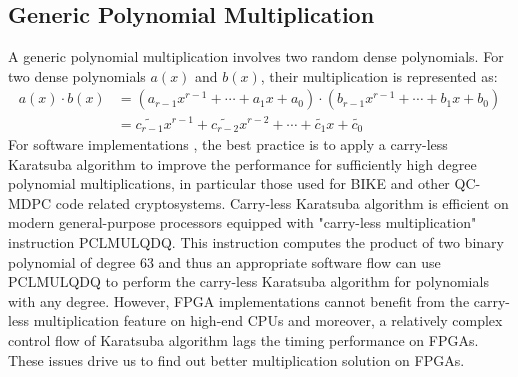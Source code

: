 \documentclass[runningheads]{llncs}
\begin{document}
\subsection{Generic Polynomial Multiplication}
\label{sub::dense}
A generic polynomial multiplication involves two random dense polynomials.
For two dense polynomials $a(x)$ and $b(x)$, their multiplication is represented as:
\begin{align}
    a(x)\cdot b(x) &= (a_{r-1}x^{r-1}+\cdots + a_{1}x + a_0)\cdot(b_{r-1}x^{r-1}+\cdots + b_{1}x + b_0)\\
    &= \widetilde{c_{r-1}}x^{r-1}+\widetilde{c_{r-2}}x^{r-2}+\cdots + \widetilde{c_{1}}x +\widetilde{c_0}
\end{align}
%
For software implementations \cite{chou2016qcbits,drucker2017toolbox}, the best practice is to apply a carry-less Karatsuba algorithm to improve the performance for sufficiently high degree polynomial multiplications, in particular those used for BIKE and other QC-MDPC code related cryptosystems. Carry-less Karatsuba algorithm is efficient on modern general-purpose processors equipped with "carry-less multiplication" instruction PCLMULQDQ. This instruction computes the product of two binary polynomial of degree 63 and thus an appropriate software flow can use PCLMULQDQ to perform the carry-less Karatsuba algorithm for polynomials with any degree. However, FPGA implementations cannot benefit from the carry-less multiplication feature on high-end CPUs and moreover, a relatively complex control flow of Karatsuba algorithm lags the timing performance on FPGAs. These issues drive us to find out better multiplication solution on FPGAs.
\end{document}

